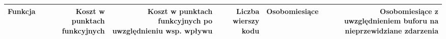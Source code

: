 \documentclass{mwrep}
\begin{document}
\begin{table}
    \begin{center}
        \begin{tabular}{|p{7cm}|r|r|r|r|r|} \hline
            \multicolumn{1}{|m{7cm}|}{\centering Funkcja}                                                                        &
            \multicolumn{1}{m{2,5cm}|}{\centering Koszt w punktach funkcyjnych}                                                  &
            \multicolumn{1}{m{4cm}|}{\centering Koszt w punktach funkcyjnych po uwzględnieniu wsp. wpływu}                       &
            \multicolumn{1}{m{2,5cm}|}{\centering Liczba wierszy kodu}                                                           &
            \multicolumn{1}{m{2,5cm}|}{\centering Osobomiesiące}                                                                 &
            \multicolumn{1}{m{4cm}|}{\centering Osobomiesiące z uwzględnieniem buforu na nieprzewidziane zdarzenia}              \\ \hline


\end{tabular}
\end{center}
\end{table}
\end{document}
